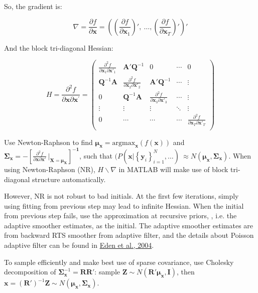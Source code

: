 \documentclass[]{article}
\begin{document}
So, the gradient is:

\[\nabla = \frac{\partial f}{\partial\mathbf{x}} = \left( \left( \frac{\partial f}{\partial\mathbf{x}_{1}} \right)',\ \ldots,\left( \frac{\partial f}{\partial\mathbf{x}_{T}} \right)' \right)'\]

And the block tri-diagonal Hessian:

\[H = \frac{\partial^{2}f}{\partial\mathbf{x}\partial\mathbf{x}^{'}} = \begin{pmatrix}
	\frac{\partial^{2}f}{\partial\mathbf{x}_{1}\partial\mathbf{x}'_{1}} & \mathbf{A'}\mathbf{Q}^{- 1} & 0 & \cdots & 0 \\
	\mathbf{Q}^{- 1}\mathbf{A} & \frac{\partial^{2}f}{\partial\mathbf{x}_{2}\partial\mathbf{x}'_{2}} & \mathbf{A'}\mathbf{Q}^{- 1} & \cdots & \vdots \\
	0 & \mathbf{Q}^{- 1}\mathbf{A} & \frac{\partial^{2}f}{\partial\mathbf{x}_{3}\partial\mathbf{x}'_{3}} & \cdots & \vdots \\
	\vdots & \vdots & \vdots & \ddots & \vdots \\
	0 & \cdots & \cdots & \cdots & \frac{\partial^{2}f}{\partial\mathbf{x}_{T}\partial\mathbf{x}'_{T}} \\
\end{pmatrix}\]

Use Newton-Raphson to find
\(\bm{\mu}_{\mathbf{x}} =\text{argmax}_{\mathbf{x}}\left( f\left( \mathbf{x} \right) \right)\)
and \(\mathbf{\Sigma}_{\mathbf{x}}= -\left\lbrack \frac{\partial^{2}f}{\partial\mathbf{x}\partial\mathbf{x}'}\left. \ \mathbf{} \right|_{\mathbf{X} = \bm{\mu}_{\mathbf{X}}} \right\rbrack^{\mathbf{- 1}}\), such that \((P(\mathbf{x}|\left\{ \mathbf{y}_{i} \right\}_{i = 1}^{N},\ldots)\ \approx N\left(\bm{\mu}_{\mathbf{x}}, \mathbf{\Sigma}_{\mathbf{x}}\right)\).
When using Newton-Raphson (NR), \(H\backslash\nabla\) in MATLAB will make use
of block tri-diagonal structure automatically.

However, NR is not robust to bad initials. At the first few iterations, simply using fitting from previous step may lead to infinite Hessian. When the initial from previous step fails, use the approximation at recursive priors, , i.e. the adaptive smoother estimates, as the initial. The adaptive smoother estimates are from backward RTS smoother from adaptive filter, and the details about Poisson adaptive filter can be found in  \href{http://www.stat.columbia.edu/~liam/teaching/neurostat-spr11/papers/brown-et-al/eden2004.pdf}{Eden et al., 2004}.

To sample efficiently and make best use of sparse covariance, use Cholesky decomposition of
\(\mathbf{\Sigma}_{\mathbf{x}}^{- 1} = \mathbf{R}\mathbf{R}'\):
sample
\(\mathbf{Z} \sim N(\mathbf{R}'\mathbf{\mu}_{\mathbf{x}},\mathbf{I})\),
then
\(\mathbf{x} = \left( \mathbf{R}' \right)^{- 1}\mathbf{Z} \sim N(\bm{\mu}_{\mathbf{x}},\mathbf{\Sigma}_{\mathbf{x}})\).   
\end{document}
